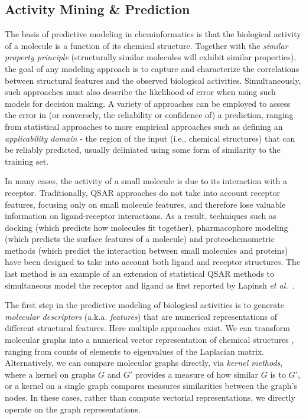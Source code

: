 \documentclass{sig-alternate}
\begin{document}
\subsection{Activity Mining \& Prediction}
\label{sec:activity-mining}


The basis of predictive modeling in cheminformatics is that the
biological activity of a molecule is a function of its chemical
structure. Together with the \emph{similar property principle}
\cite{Johnson:1990qf} (structurally similar molecules will exhibit
similar properties), the goal of any modeling approach is to capture
and characterize the correlations between structural features and the
observed biological activities. Simultaneously, such approaches must
also describe the likelihood of error when using such
models for decision making.  A variety of approaches can be employed
to assess the error in (or conversely, the reliability or confidence of) a
prediction, ranging from statistical approaches to more
empirical approaches such as defining an \emph{applicability domain} -
the region of the input (i.e., chemical structures) that can be
reliably predicted, usually deliniated using some form of similarity
to the training set.

In many cases, the activity of a small molecule is due to its
interaction with a receptor. Traditionally, QSAR \cite{Hansch:1962vn,
  Free:1964ys} approaches do not take into account receptor features,
focusing only on small molecule features, and therefore lose valuable
information on ligand-receptor interactions. As a result, techniques
such as docking (which predicts how molecules fit together), pharmacophore modeling (which predicts the surface features of a molecule) and proteochemometric methods (which predict the interaction between small molecules and proteins)
have been designed to take into account both ligand and receptor
structures. The last method is an example of an extension of
statistical QSAR methods to simultaneous model the receptor and
ligand as first reported by Lapinsh \textit{et  al.}~\cite{lapinsh2001}.

The first step in the predictive modeling of biological activities is
to generate \emph{molecular descriptors} (a.k.a. \emph{features}) that are numerical
representations of different structural features. Here multiple
approaches exist. We can transform molecular graphs into a numerical
vector representation of chemical structures \cite{todeschini2000}, ranging from counts of
elements to eigenvalues of the Laplacian matrix.  Alternatively, we
can compare molecular graphs directly, via \emph{kernel methods}, where a kernel on graphs $G$ and $G'$ provides a measure of how similar $G$ is to $G'$, or a kernel on a single graph compares measures similarities between the graph's nodes. In these
cases, rather than compute vectorial representations, we directly
operate on the graph representations.
\end{document}
